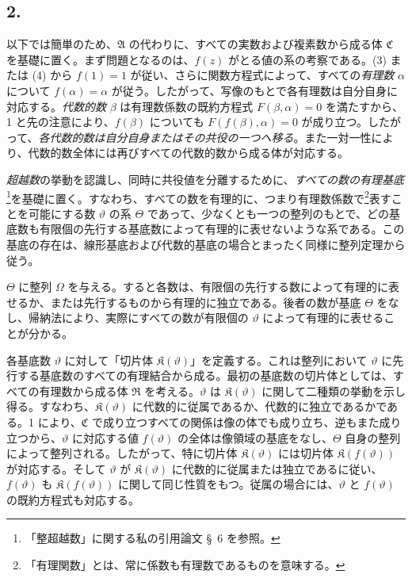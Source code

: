 \subsection*{2.}

以下では簡単のため、$\mathfrak A$ の代わりに、すべての実数および複素数から成る体 $\mathfrak C$ を基礎に置く。まず問題となるのは、$f(z)$ がとる値の系の考察である。(3) または (4) から $f(1)=1$ が従い、さらに関数方程式によって、すべての\emph{有理数} $\alpha$ について $f(\alpha)=\alpha$ が従う。したがって、写像のもとで各有理数は自分自身に対応する。\emph{代数的数} $\beta$ は有理数係数の既約方程式 $F(\beta,\alpha)=0$ を満たすから、1 と先の注意により、$f(\beta)$ についても $F(f(\beta),\alpha)=0$ が成り立つ。したがって、\emph{各代数的数は自分自身またはその共役の一つへ移る}。また一対一性により、代数的数全体には再びすべての代数的数から成る体が対応する。

\emph{超越数}の挙動を認識し、同時に共役値を分離するために、\emph{すべての数の有理基底}\footnote{「整超越数」に関する私の引用論文 \S\ 6 を参照。}を基礎に置く。すなわち、すべての数を有理的に、つまり有理数係数で\footnote{「有理関数」とは、常に係数も有理数であるものを意味する。}表すことを可能にする数 $\vartheta$ の系 $\Theta$ であって、少なくとも一つの整列のもとで、どの基底数も有限個の先行する基底数によって有理的に表せないような系である。この基底の存在は、線形基底および代数的基底の場合とまったく同様に整列定理から従う。

$\Theta$ に整列 $\Omega$ を与える。すると各数は、有限個の先行する数によって有理的に表せるか、または先行するものから有理的に独立である。後者の数が基底 $\Theta$ をなし、帰納法により、実際にすべての数が有限個の $\vartheta$ によって有理的に表せることが分かる。

各基底数 $\vartheta$ に対して「切片体 $\mathfrak K(\vartheta)$」を定義する。これは整列において $\vartheta$ に先行する基底数のすべての有理結合から成る。最初の基底数の切片体としては、すべての有理数から成る体 $\mathfrak R$ を考える。$\vartheta$ は $\mathfrak K(\vartheta)$ に関して二種類の挙動を示し得る。すなわち、$\mathfrak K(\vartheta)$ に代数的に従属であるか、代数的に独立であるかである。1 により、$\mathfrak C$ で成り立つすべての関係は像の体でも成り立ち、逆もまた成り立つから、$\vartheta$ に対応する値 $f(\vartheta)$ の全体は像領域の基底をなし、$\Theta$ 自身の整列によって整列される。したがって、特に切片体 $\mathfrak K(\vartheta)$ には切片体 $\mathfrak K(f(\vartheta))$ が対応する。そして $\vartheta$ が $\mathfrak K(\vartheta)$ に代数的に従属または独立であるに従い、$f(\vartheta)$ も $\mathfrak K(f(\vartheta))$ に関して同じ性質をもつ。従属の場合には、$\vartheta$ と $f(\vartheta)$ の既約方程式も対応する。

